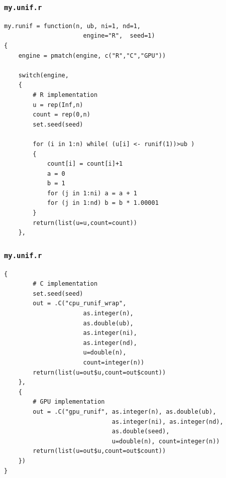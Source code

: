 \documentclass[handout]{beamer}
\numberwithin{equation}{section}
\begin{document}
\begin{frame}[fragile]
\frametitle{{\tt my.unif.r}}  \lstset{basicstyle=\tiny}
\lstset{language=R}
\begin{lstlisting}[name=myunifr]
my.runif = function(n, ub, ni=1, nd=1, 
                      engine="R",  seed=1)
{
    engine = pmatch(engine, c("R","C","GPU"))

    switch(engine,
    {
        # R implementation
        u = rep(Inf,n)
        count = rep(0,n)
        set.seed(seed)

        for (i in 1:n) while( (u[i] <- runif(1))>ub ) 
        {
            count[i] = count[i]+1
            a = 0
            b = 1
            for (j in 1:ni) a = a + 1
            for (j in 1:nd) b = b * 1.00001
        }
        return(list(u=u,count=count))
    },
\end{lstlisting}
\end{frame}

\begin{frame}[fragile]
\frametitle{{\tt my.unif.r}}  \lstset{basicstyle=\tiny}
\lstset{language=R}
\begin{lstlisting}[name=myunifr]
   {
        # C implementation
        set.seed(seed)
        out = .C("cpu_runif_wrap", 
                      as.integer(n), 
                      as.double(ub), 
                      as.integer(ni), 
                      as.integer(nd),
                      u=double(n), 
                      count=integer(n))
        return(list(u=out$u,count=out$count))
    },
    {
        # GPU implementation
        out = .C("gpu_runif", as.integer(n), as.double(ub), 
                              as.integer(ni), as.integer(nd),
                              as.double(seed),
                              u=double(n), count=integer(n))
        return(list(u=out$u,count=out$count))
    })
}
\end{lstlisting}
\end{frame}
\end{document}
